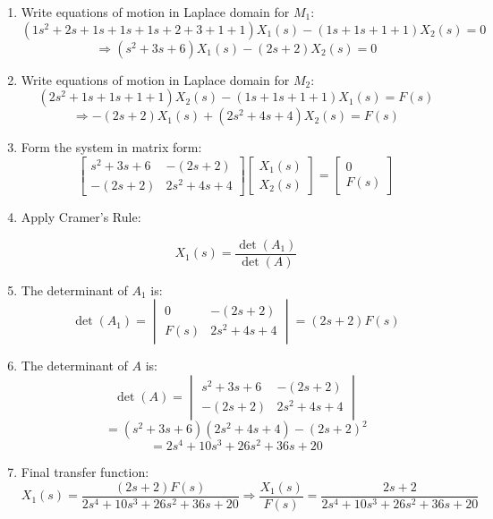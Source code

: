 \documentclass[11pt]{article}
\begin{document}
\begin{enumerate}[label=(\alph*), itemindent=*, leftmargin=*, nolistsep]

    \item Write equations of motion in Laplace domain for $M_1$:
    \[
    (1s^2 + 2s + 1s + 1s + 1s + 2 + 3 + 1 + 1)X_1(s) - (1s + 1s + 1 + 1)X_2(s) = 0
    \]
    \[
    \Rightarrow (s^2 + 3s + 6)X_1(s) - (2s + 2)X_2(s) = 0
    \]

    \item Write equations of motion in Laplace domain for $M_2$:
    \[
    (2s^2 + 1s + 1s + 1 + 1)X_2(s) - (1s + 1s + 1 + 1)X_1(s) = F(s)
    \]
    \[
    \Rightarrow -(2s + 2)X_1(s) + (2s^2 + 4s + 4)X_2(s) = F(s)
    \]

    \item Form the system in matrix form:
    \[
    \begin{bmatrix}
    s^2 + 3s + 6 & -(2s + 2) \\
    -(2s + 2) & 2s^2 + 4s + 4
    \end{bmatrix}
    \begin{bmatrix}
    X_1(s) \\
    X_2(s)
    \end{bmatrix}
    =
    \begin{bmatrix}
    0 \\
    F(s)
    \end{bmatrix}
    \]

    \item Apply Cramer's Rule:

    \[
    X_1(s) = \frac{\det(A_1)}{\det(A)}
    \]

    \item The determinant of \( A_1 \) is:
    \[
    \det(A_1) = \begin{vmatrix}
    0 & -(2s + 2) \\
    F(s) & 2s^2 + 4s + 4
    \end{vmatrix}
    = (2s + 2)F(s)
    \]

    \item The determinant of \( A \) is:
    \[
    \det(A) = \begin{vmatrix}
    s^2 + 3s + 6 & -(2s + 2) \\
    -(2s + 2) & 2s^2 + 4s + 4
    \end{vmatrix}
    \]
    \[
    = (s^2 + 3s + 6)(2s^2 + 4s + 4) - (2s + 2)^2
    \]
    \[
    = 2s^4 + 10s^3 + 26s^2 + 36s + 20
    \]

    \item Final transfer function:
    \[
    X_1(s) = \frac{(2s + 2)F(s)}{2s^4 + 10s^3 + 26s^2 + 36s + 20}
    \Rightarrow
    \boxed{
    \frac{X_1(s)}{F(s)} = \frac{2s + 2}{2s^4 + 10s^3 + 26s^2 + 36s + 20}
    }
    \]
\end{enumerate}
\end{document}
